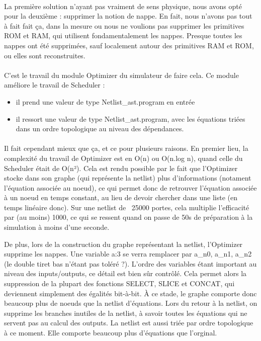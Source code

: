 \documentclass{article}
\begin{document}
\paragraph{}La première solution n'ayant pas vraiment de sens physique, nous avons opté pour la deuxième : supprimer la notion de nappe.
En  fait, nous n'avons pas tout à fait fait ça, dans la mesure ou nous ne  voulions pas supprimer les primitives ROM et RAM, qui utilisent  fondamentalement les nappes.
Presque toutes les nappes ont été supprimées, sauf localement autour des primitives RAM et ROM, ou elles sont reconstruites.

\paragraph{}C'est le travail du module Optimizer du simulateur de faire cela. Ce module améliore le travail de Scheduler :
\begin{itemize}
	\item il prend une valeur de type Netlist_ast.program en entrée
	\item il  ressort une valeur de type Netlist_ast.program, avec les équations  triées dans un ordre topologique au niveau des dépendances.
\end{itemize}

\paragraph{}Il fait cependant mieux que ça, et ce pour plusieurs raisons.
En premier lieu, la complexité du travail de Optimizer est  en O(n) ou O(n.log n), quand celle du Scheduler était de O(n²). Cela  est rendu possible par le fait que l'Optimizer stocke dans son graphe  (qui représente la netlist) plus d'informations (notament l'équation  associée au noeud), ce qui permet donc de retrouver l'équation associée à  un noeud en temps constant, au lieu de devoir chercher dans une liste  (en temps linéaire donc). Sur une netlist de ~25000 portes, cela  multiplie l'efficacité par (au moins) 1000, ce qui se ressent quand on  passe de 50s de préparation à la simulation à moins d'une seconde.

De  plus, lors de la construction du graphe représentant la netlist,  l'Optimizer supprime les nappes. Une variable a:3 se verra remplacer par  a_n0, a_n1, a_n2 (le double tiret bas n'étant pas toléré ?). L'ordre  des variables étant important au niveau des inputs/outputs, ce détail  est bien sûr  contrôlé. Cela permet alors la suppression de la plupart des fonctions  SELECT, SLICE et CONCAT, qui deviennent simplement des égalités  bit-à-bit. À ce stade, le graphe comporte donc beaucoup plus de noeuds  que la netlist d'équations.
Lors  du retour à la netlist, on supprime les branches inutiles de la  netlist, à savoir toutes les équations qui ne servent pas au calcul des  outputs. La netlist est aussi triée par ordre topologique à ce moment.  Elle comporte beaucoup plus d'équations que l'orginal.
\end{document}
